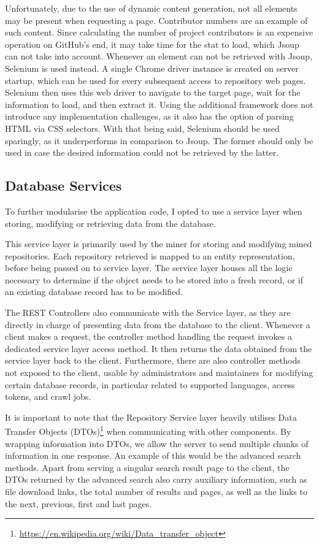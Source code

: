Unfortunately, due to the use of dynamic content generation, not all elements may be present when requesting a page.
Contributor numbers are an example of such content.
Since calculating the number of project contributors is an expensive operation on GitHub's end, it may take time for the stat to load, which Jsoup can not take into account.
Whenever an element can not be retrieved with Jsoup, Selenium is used instead.
A single Chrome driver instance is created on server startup, which can be used for every subsequent access to repository web pages.
Selenium then uses this web driver to navigate to the target page, wait for the information to load, and then extract it.
Using the additional framework does not introduce any implementation challenges, as it also has the option of parsing HTML via CSS selectors.
With that being said, Selenium should be used sparingly, as it underperforms in comparison to Jsoup.
The former should only be used in case the desired information could not be retrieved by the latter.

\subsection{Database Services}

To further modularise the application code, I opted to use a service layer when storing, modifying or retrieving data from the database.

This service layer is primarily used by the miner for storing and modifying mined repositories.
Each repository retrieved is mapped to an entity representation, before being passed on to service layer.
The service layer houses all the logic necessary to determine if the object needs to be stored into a fresh record, or if an existing database record has to be modified.

The REST Controllers also communicate with the Service layer, as they are directly in charge of presenting data from the database to the client.
Whenever a client makes a request, the controller method handling the request invokes a dedicated service layer access method.
It then returns the data obtained from the service layer back to the client.
Furthermore, there are also controller methods not exposed to the client, usable by administrators and maintainers for modifying certain database records, in particular related to supported languages, access tokens, and crawl jobs.

It is important to note that the Repository Service layer heavily utilises Data Transfer Objects (DTOs)\footnote{\url{https://en.wikipedia.org/wiki/Data_transfer_object}} when communicating with other components.
By wrapping information into DTOs, we allow the server to send multiple chunks of information in one response.
An example of this would be the advanced search methods.
Apart from serving a singular search result page to the client, the DTOs returned by the advanced search also carry auxiliary information, such as file download links, the total number of results and pages, as well as the links to the next, previous, first and last pages.

